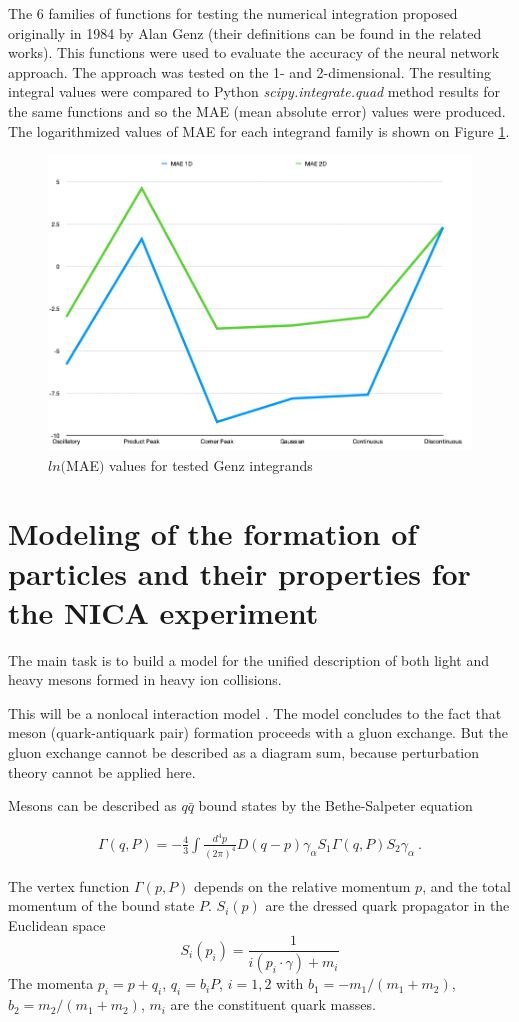 \documentclass[%
]{ittmm}
\begin{document}
The 6 families of functions for testing the numerical integration proposed originally in 1984 by Alan Genz\cite{genz} (their definitions can be found in the related works). This functions were used to evaluate the accuracy of the neural network approach. The approach was tested on the 1- and 2-dimensional. The resulting integral values were compared to Python \textit{scipy.integrate.quad} method results for the same functions and so the MAE (mean absolute error) values were produced. The logarithmized values of MAE for each integrand family is shown on Figure \ref{fig:genz-tests}.

\begin{figure}
\centering
\includegraphics[width=0.5\linewidth]{maes.png}
\caption{ $ln($MAE$)$ values for tested Genz integrands}
\label{fig:genz-tests}
\end{figure}


\section{Modeling of the formation of particles and their properties for the NICA experiment}

The main task is to build a model for the unified description of both light and heavy mesons formed in heavy ion collisions.

 This will be a nonlocal interaction model \cite{schmidt, costa}. 
 The model concludes to the fact that meson (quark-antiquark pair) formation proceeds with a gluon exchange. But the gluon exchange cannot be described as a diagram sum, because perturbation theory cannot be applied here. 
 
 Mesons can be described as $q\bar{q}$ bound states by 
the Bethe-Salpeter equation

\begin{eqnarray}\label{BS}
  \Gamma (q,P) = -\frac{4}{3} \int \frac{d^4 p}{(2\pi)^4}
  D(q-p) \gamma_\alpha S_1 \Gamma (q,P)
S_2 \gamma_\alpha \  .
\end{eqnarray}

The vertex function $\Gamma (p,P)$ depends on the relative
momentum $p$, and the total momentum of the bound state $P$. 
$S_i(p)$ are the dressed quark propagator in the Euclidean space 
\begin{equation}\label{Eqn:q_prop}
S_i(p_i)=\frac{1}{i (p_i\cdot \gamma) + m_i}
\end{equation}
The momenta $p_i=p+q_i$, $q_i = b_i P$, $i=1,2$ with 
$b_1 =- m_1/(m_1+m_2)$, $b_2 = m_2/(m_1+m_2)$, $m_i$ are the constituent quark masses. 
\end{document}
